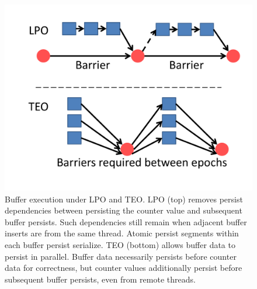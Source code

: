 \begin{figure}
\centering
\includegraphics[width=\textwidth]{PMC_patterns/buffer_TEO_LPO.pdf}
\caption{Buffer execution under LPO and TEO.  LPO (top) removes persist dependencies between persisting the counter value and subsequent buffer persists.  Such dependencies still remain when adjacent buffer inserts are from the same thread.  Atomic persist segments within each buffer persist serialize.  TEO (bottom) allows buffer data to persist in parallel.  Buffer data necessarily persists before counter data for correctness, but counter values additionally persist before subsequent buffer persists, even from remote threads.}
\label{figure::buffer_TEO_LPO}
\end{figure}
